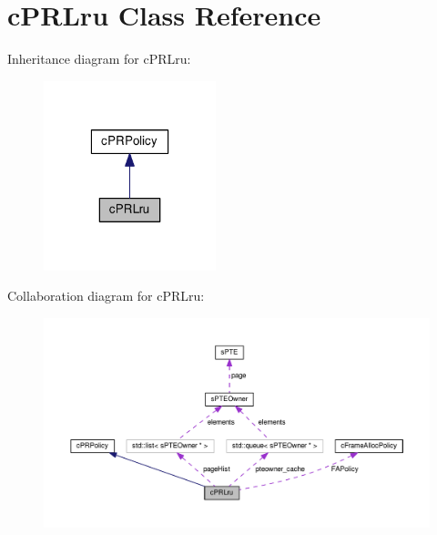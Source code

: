 \hypertarget{classcPRLru}{\section{c\-P\-R\-Lru \-Class \-Reference}
\label{da/da5/classcPRLru}
}


\-Inheritance diagram for c\-P\-R\-Lru\-:\nopagebreak
\begin{figure}[H]
\begin{center}
\leavevmode
\includegraphics[width=142pt]{d9/da4/classcPRLru__inherit__graph}
\end{center}
\end{figure}


\-Collaboration diagram for c\-P\-R\-Lru\-:\nopagebreak
\begin{figure}[H]
\begin{center}
\leavevmode
\includegraphics[width=350pt]{da/d0b/classcPRLru__coll__graph}
\end{center}
\end{figure}
